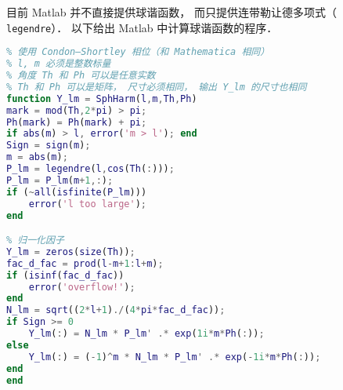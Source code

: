 
目前 Matlab 并不直接提供球谐函数， 而只提供连带勒让德多项式（ \lstinline|legendre|）． 以下给出 Matlab 中计算球谐函数的程序．

\begin{lstlisting}[language=matlab, caption=SphHarm.m]
% 计算球谐函数 Y_{lm}
% 使用 Condon–Shortley 相位（和 Mathematica 相同）
% l, m 必须是整数标量
% 角度 Th 和 Ph 可以是任意实数
% Th 和 Ph 可以是矩阵， 尺寸必须相同， 输出 Y_lm 的尺寸也相同
function Y_lm = SphHarm(l,m,Th,Ph)
mark = mod(Th,2*pi) > pi;
Ph(mark) = Ph(mark) + pi;
if abs(m) > l, error('m > l'); end
Sign = sign(m);
m = abs(m);
P_lm = legendre(l,cos(Th(:)));
P_lm = P_lm(m+1,:);
if (~all(isfinite(P_lm)))
    error('l too large');
end

% 归一化因子
Y_lm = zeros(size(Th));
fac_d_fac = prod(l-m+1:l+m);
if (isinf(fac_d_fac))
    error('overflow!');
end
N_lm = sqrt((2*l+1)./(4*pi*fac_d_fac));
if Sign >= 0
    Y_lm(:) = N_lm * P_lm' .* exp(1i*m*Ph(:));
else
    Y_lm(:) = (-1)^m * N_lm * P_lm' .* exp(-1i*m*Ph(:));
end
end
\end{lstlisting}
